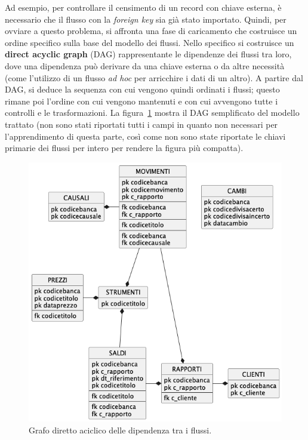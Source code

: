 Ad esempio, per controllare il censimento di un record con chiave esterna, è necessario che il flusso con la \textit{foreign key} sia già stato importato.
Quindi, per ovviare a questo problema, si affronta una fase di caricamento che costruisce un ordine specifico sulla base del modello dei flussi.
Nello specifico si costruisce un \textbf{direct acyclic graph} (DAG) rappresentante le dipendenze dei flussi tra loro, dove una dipendenza può derivare da una chiave esterna o da altre necessità (come l'utilizzo di un flusso \textit{ad hoc} per arricchire i dati di un altro).
A partire dal DAG, si deduce la sequenza con cui vengono quindi ordinati i flussi;
questo rimane poi l'ordine con cui vengono mantenuti e con cui avvengono tutte i controlli e le trasformazioni.
La figura~\ref{fig:dag-model} mostra il DAG semplificato del modello trattato (non sono stati riportati tutti i campi in quanto non necessari per l'apprendimento di questa parte, così come non sono state riportate le chiavi primarie dei flussi per intero per rendere la figura più compatta).
\begin{figure}
    \includegraphics[width=\textwidth]{img/dag-model.png}
    \centering
    \caption{Grafo diretto aciclico delle dipendenza tra i flussi.}
    \label{fig:dag-model}
\end{figure}

